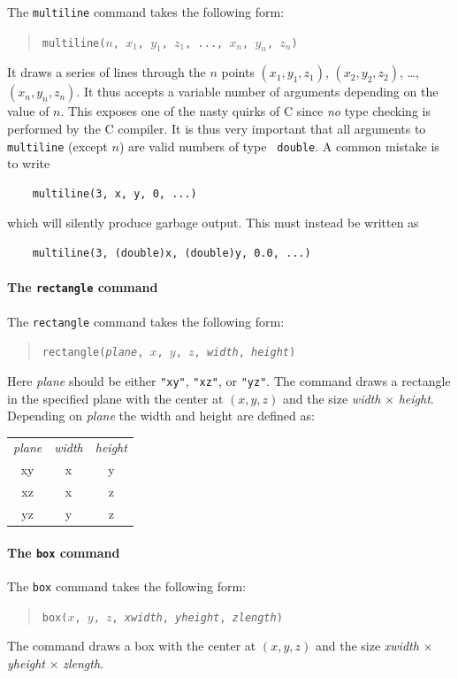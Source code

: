 The {\tt multiline} command takes the following form:
\begin{quote}
  \texttt{multiline($n$, $x_1$, $y_1$, $z_1$, ..., $x_n$, $y_n$, $z_n$)}
\end{quote}
It draws a series of lines through the $n$ points $(x_1, y_1, z_1)$,
$(x_2, y_2, z_2)$, \ldots, $(x_n, y_n, z_n)$. It thus accepts a variable
number of arguments depending on the value of $n$. This exposes
one of the nasty quirks of C since \emph{no} type checking is
performed by the C compiler. It is thus very important that all
arguments to {\tt multiline} (except $n$) are valid numbers of type {\tt
  double}. A common mistake is to write
\begin{verbatim}
    multiline(3, x, y, 0, ...)
\end{verbatim}
which will silently produce garbage output. This must instead be
written as
\begin{verbatim}
    multiline(3, (double)x, (double)y, 0.0, ...)
\end{verbatim}

\paragraph{The {\tt rectangle} command}

The {\tt rectangle} command takes the following form:
\begin{quote}
  \texttt{rectangle({\it plane}, $x$, $y$, $z$, {\it width}, {\it height})}
\end{quote}
Here {\it plane} should be either \verb+"xy"+, \verb+"xz"+, or
\verb+"yz"+. The command draws a rectangle in the specified plane with
the center at $(x, y, z)$ and the size {\it width} $\times$ {\it
height}. Depending on {\it plane} the width and height are defined as:\\
\begin{tabular} {ccc}
  {\it plane} & {\it width} & {\it height} \\
  xy & x & y \\
  xz & x & z \\
  yz & y & z \\
 \end{tabular}

\paragraph{The {\tt box} command}

The {\tt box} command takes the following form:
\begin{quote}
  \texttt{box($x$, $y$, $z$, {\it xwidth}, {\it yheight}, {\it zlength})}
\end{quote}
The command draws a box with the center at $(x, y, z)$ and the size {\it xwidth} $\times$ {\it yheight} $\times$ {\it zlength}.


